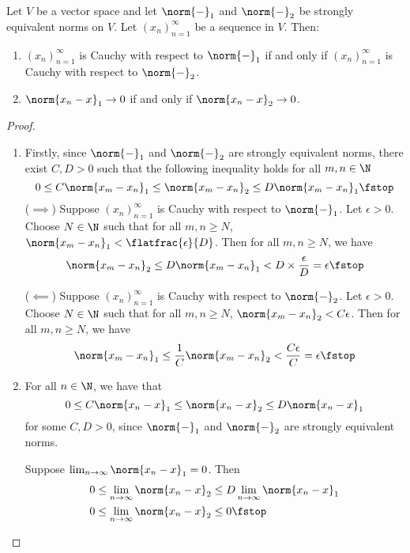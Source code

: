  \begin{proposition}
   \label{thm:norm-equiv-conv}
   Let \( V \) be a vector space and let \( \norm{-}_1 \) and \( \norm{-}_2 \) be strongly equivalent norms on \( V \). Let \( (x_n)_{n=1}^\infty \) be a sequence in \( V \). Then:
   \begin{enumerate}[label=(\alph*)]
   \item \( (x_n)_{n=1}^\infty \) is Cauchy with respect to \( \norm{-}_1 \) if and only if \( (x_n)_{n=1}^\infty \) is Cauchy with respect to \( \norm{-}_2 \).
   \item \( \norm{x_n-x}_1\to 0 \) if and only if \( \norm{x_n-x}_2\to 0 \).
   \end{enumerate}
 \end{proposition}
 \begin{proof}
   \begin{enumerate}[label=(\alph*)]
   \item Firstly, since \( \norm{-}_1 \) and \( \norm{-}_2 \) are strongly equivalent norms, there exist \( C,D>0 \) such that the following inequality holds for all \( m,n\in\N \)
     \[ 0\leq C\norm{x_m-x_n}_1\leq\norm{x_m-x_n}_2\leq D\norm{x_m-x_n}_1\fstop \]
     (\( \implies \)) Suppose \( (x_n)_{n=1}^\infty \) is Cauchy with respect to \( \norm{-}_1 \). Let \( \epsilon>0 \). Choose \( N\in\N \) such that for all \( m,n\geq N \), \( \norm{x_m-x_n}_1<\flatfrac{\epsilon}{D} \). Then for all \( m,n\geq N \), we have
     \[ \norm{x_m-x_n}_2\leq D\norm{x_m-x_n}_1<D\times\frac{\epsilon}{D}=\epsilon\fstop \]

     (\( \impliedby \)) Suppose \( (x_n)_{n=1}^\infty \) is Cauchy with respect to \( \norm{-}_2 \). Let \( \epsilon>0 \). Choose \( N\in\N \) such that for all \( m,n\geq N \), \( \norm{x_m-x_n}_2<C\epsilon \). Then for all \( m,n\geq N \), we have
     \[ \norm{x_m-x_n}_1\leq \frac{1}{C}\norm{x_m-x_n}_2<\frac{C\epsilon}{C}=\epsilon\fstop \]
   \item For all \( n\in\N \), we have that
     \[ 0\leq C\norm{x_n-x}_1\leq\norm{x_n-x}_2\leq D\norm{x_n-x}_1 \]
     for some \( C,D>0 \), since \( \norm{-}_1 \) and \( \norm{-}_2 \) are strongly equivalent norms.

     \vspace{3mm}

     Suppose \( \lim_{n\to\infty}\norm{x_n-x}_1=0 \). Then
     \begin{align*}
       0&\leq\lim_{n\to\infty}\norm{x_n-x}_2\leq D\lim_{n\to\infty}\norm{x_n-x}_1\\
       0&\leq\lim_{n\to\infty}\norm{x_n-x}_2\leq 0\fstop
     \end{align*}


\end{enumerate}
\end{proof}
